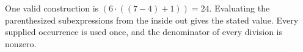 One valid construction is $\boxed{(6\cdot ((7-4)+1))=24}$. Evaluating the parenthesized subexpressions from the inside out gives the stated value. Every supplied occurrence is used once, and the denominator of every division is nonzero.
